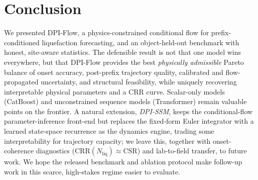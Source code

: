 \documentclass[letterpaper]{article} %
\begin{document}
\section{Conclusion}
We presented DPI-Flow, a physics-constrained conditional flow for prefix-conditioned liquefaction
forecasting, and an object-held-out benchmark with honest, site-aware statistics. The defensible result is
not that one model wins everywhere, but that DPI-Flow provides the best \emph{physically admissible} Pareto
balance of onset accuracy, post-prefix trajectory quality, calibrated and flow-propagated uncertainty, and
structural feasibility, while uniquely recovering interpretable physical parameters and a CRR curve.
Scalar-only models (CatBoost) and unconstrained sequence models (Transformer) remain valuable points on
the frontier. A natural extension, \emph{DPI-SSM}, keeps the conditional-flow parameter-inference
front-end but replaces the fixed-form Euler integrator with a learned state-space recurrence as the
dynamics engine, trading some interpretability for trajectory capacity; we leave this, together with
onset-coherence diagnostics ($\mathrm{CRR}(N_{\mathrm{liq}})\!\approx\!\mathrm{CSR}$) and lab-to-field
transfer, to future work. We hope the released benchmark and ablation protocol make follow-up work in this
scarce, high-stakes regime easier to evaluate.


\end{document}
